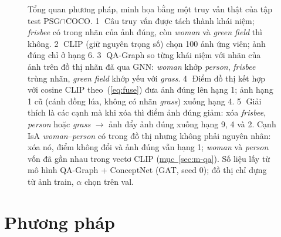 \documentclass[conference]{IEEEtran}
\begin{document}
\begin{figure}[t]
\centering
\resizebox{\textwidth}{!}{}
\caption{Tổng quan phương pháp, minh họa bằng một truy vấn thật của tập test PSG$\cap$COCO. \textcircled{\scriptsize 1} Câu truy vấn được tách thành khái niệm; \emph{frisbee} có trong nhãn của ảnh đúng, còn \emph{woman} và \emph{green field} thì không. \textcircled{\scriptsize 2} CLIP (giữ nguyên trọng số) chọn 100 ảnh ứng viên; ảnh đúng chỉ ở hạng 6. \textcircled{\scriptsize 3} QA-Graph so từng khái niệm với nhãn của ảnh trên đồ thị nhãn đã qua GNN: \emph{woman} khớp \emph{person}, \emph{frisbee} trùng nhãn, \emph{green field} khớp yếu với \emph{grass}. \textcircled{\scriptsize 4} Điểm đồ thị kết hợp với cosine CLIP theo~(\ref{eq:fuse}) đưa ảnh đúng lên hạng 1; ảnh hạng 1 cũ (cánh đồng lúa, không có nhãn \emph{grass}) xuống hạng 4. \textcircled{\scriptsize 5} Giải thích là các cạnh mà khi xóa thì điểm ảnh đúng giảm: xóa \emph{frisbee}, \emph{person} hoặc \emph{grass} $\to$ ảnh đẩy ảnh đúng xuống hạng 9, 4 và 2. Cạnh IsA \emph{woman}--\emph{person} có trong đồ thị nhưng không phải nguyên nhân: xóa nó, điểm không đổi và ảnh đúng vẫn hạng 1; \emph{woman} và \emph{person} vốn đã gần nhau trong vectơ CLIP (\hyperref[sec:m-qa]{mục~\ref*{sec:m-qa}}). Số liệu lấy từ mô hình QA-Graph + ConceptNet (GAT, seed 0); đồ thị chỉ dựng từ ảnh train, $\alpha$ chọn trên val.}\label{fig:pipe}
\end{figure}

\section{Phương pháp}\label{sec:method}
\end{document}
